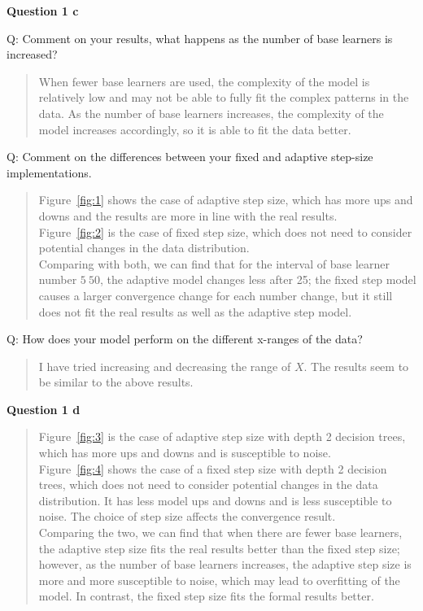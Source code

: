 \documentclass[12pt,a4paper]{article}
\begin{document}
    \newpage
    \textbf{Question 1 c}
    \vspace{2mm}

    Q: Comment on your results, what happens as the number of base learners is increased?
    \begin{quote}
        When fewer base learners are used, the complexity of the model is relatively low and may not be
        able to fully fit the complex patterns in the data.
        As the number of base learners increases, the complexity of the model increases accordingly, so
        it is able to fit the data better.
    \end{quote}
    Q: Comment on the differences between your fixed and adaptive step-size implementations.
    \begin{quote}
        Figure~\ref{fig:1} shows the case of adaptive step size, which has more ups and downs and the results are more
        in line with the real results.\vspace{10pt}\\
        Figure~\ref{fig:2} is the case of fixed step size, which does not need to consider potential changes in the data distribution.\vspace{10pt}\\
        Comparing with both, we can find that for the interval of base learner number $5~50$,
        the adaptive model changes less after 25; the fixed step model causes a larger convergence change
        for each number change, but it still does not fit the real results as well as the adaptive step model.
    \end{quote}
    Q: How does your model perform on the different x-ranges of the data?
    \begin{quote}
        I have tried increasing and decreasing the range of $X$.
        The results seem to be similar to the above results.
    \end{quote}
    \vspace{12mm}
    \textbf{Question 1 d}
    \vspace{2mm}
    \begin{quote}
        Figure~\ref{fig:3} is the case of adaptive step size with depth 2 decision trees,
        which has more ups and downs and is susceptible to noise.\vspace{10pt}\\
        Figure~\ref{fig:4} shows the case of a fixed step size with depth 2 decision trees,
        which does not need to consider potential changes in the data distribution.
        It has less model ups and downs and is less susceptible to noise.
        The choice of step size affects the convergence result.\vspace{10pt}\\
        Comparing the two, we can find that when there are fewer base learners,
        the adaptive step size fits the real results better than the fixed step size;
        however, as the number of base learners increases, the adaptive step size is more and more susceptible to noise,
        which may lead to overfitting of the model.
        In contrast, the fixed step size fits the formal results better.
    \end{quote}
\end{document}
